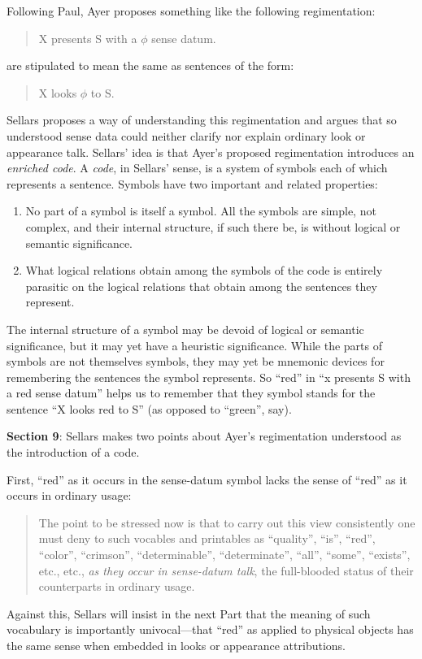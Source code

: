 \documentclass[11pt]{article}
\begin{document}
Following Paul, Ayer proposes something like the following regimentation:
\begin{quote}
	X presents S with a \( \phi \) sense datum.
\end{quote}
are stipulated to mean the same as sentences of the form:
\begin{quote}
	X looks \( \phi \) to S.
\end{quote}
Sellars proposes a way of understanding this regimentation and argues that so understood sense data could neither clarify nor explain ordinary look or appearance talk. Sellars' idea is that Ayer's proposed regimentation introduces an \emph{enriched code}. A \emph{code}, in Sellars' sense, is a system of symbols each of which represents a sentence. Symbols have two important and related properties:
\begin{enumerate}
	\item No part of a symbol is itself a symbol. All the symbols are simple, not complex, and their internal structure, if such there be, is without logical or semantic significance.
	\item What logical relations obtain among the symbols of the code is entirely parasitic on the logical relations that obtain among the sentences they represent.
\end{enumerate}
The internal structure of a symbol may be devoid of logical or semantic significance, but it may yet have a heuristic significance. While the parts of symbols are not themselves symbols, they may yet be mnemonic devices for remembering the sentences the symbol represents. So ``red'' in ``x presents S with a red sense datum'' helps us to remember that they symbol stands for the sentence ``X looks red to S'' (as opposed to ``green'', say).

\textbf{Section 9}: Sellars makes two points about Ayer's regimentation understood as the introduction of a code.

First, ``red'' as it occurs in the sense-datum symbol lacks the sense of ``red'' as it occurs in ordinary usage:
\begin{quote}
	The point to be stressed now is that to carry out this view consistently one must deny to such vocables and printables as ``quality'', ``is'', ``red'', ``color'', ``crimson'', ``determinable'', ``determinate'', ``all'', ``some'', ``exists'', etc., etc., \emph{as they occur in sense-datum talk}, the full-blooded status of their counterparts in ordinary usage.
\end{quote}
Against this, Sellars will insist in the next Part that the meaning of such vocabulary is importantly univocal---that ``red'' as applied to physical objects has the same sense when embedded in looks or appearance attributions.
\end{document}
